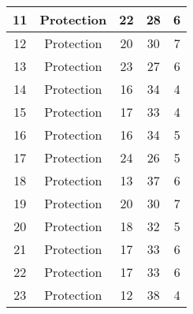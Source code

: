 \documentclass[results.tex]{subfiles}
\begin{document}
\begin{center}
\begin{tabular}{| c || c | c | c | c |}
            \hline
            11                      & Protection                   & 22                     & 28                      & 6                    \\
            \hline
            12                      & Protection                   & 20                     & 30                      & 7                    \\
            \hline
            13                      & Protection                   & 23                     & 27                      & 6                    \\
            \hline
            14                      & Protection                   & 16                     & 34                      & 4                    \\
            \hline
            15                      & Protection                   & 17                     & 33                      & 4                    \\
            \hline
            16                      & Protection                   & 16                     & 34                      & 5                    \\
            \hline
            17                      & Protection                   & 24                     & 26                      & 5                    \\
            \hline
            18                      & Protection                   & 13                     & 37                      & 6                    \\
            \hline
            19                      & Protection                   & 20                     & 30                      & 7                    \\
            \hline
            20                      & Protection                   & 18                     & 32                      & 5                    \\
            \hline
            21                      & Protection                   & 17                     & 33                      & 6                    \\
            \hline
            22                      & Protection                   & 17                     & 33                      & 6                    \\
            \hline
            23                      & Protection                   & 12                     & 38                      & 4                    \\

\end{tabular}
\end{center}
\end{document}
